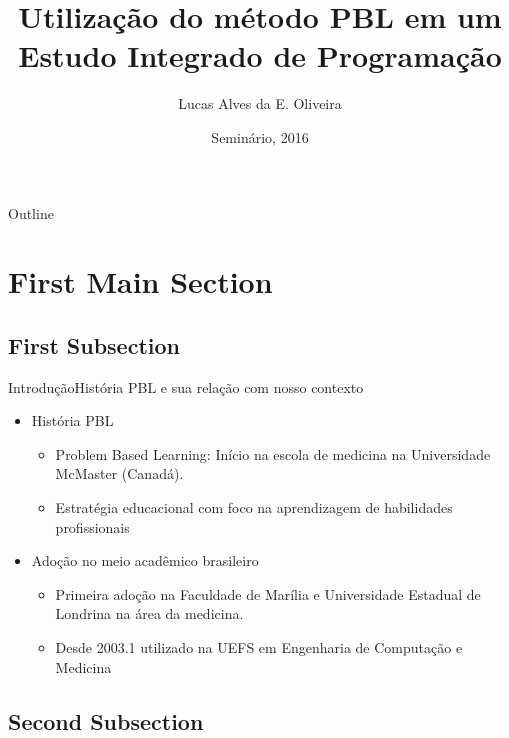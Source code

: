 \documentclass{beamer}
\title{Utilização do método PBL em um Estudo Integrado de Programação}
\author{Lucas Alves da E. Oliveira\inst{1}}
\institute[Universidade Estadual de Feira de Santana] %
{
  \inst{1}%
  Departmento de Ciências Exatas\\
  Universidade Estadual de Feira de Santana
  }
\date{Seminário, 2016}
\begin{document}
\begin{frame}
  \titlepage
\end{frame}

\begin{frame}{Outline}
  \tableofcontents
\end{frame}

\section{First Main Section}

\subsection{First Subsection}

\begin{frame}{Introdução}{História PBL e sua relação com nosso contexto}
  \begin{itemize}
    \item História PBL
    \begin{itemize}
        \item \alert{Problem Based Learning}: Início na escola de medicina na Universidade McMaster (Canadá).
        \item Estratégia educacional com foco na aprendizagem de habilidades profissionais
    \end{itemize} 
    \item Adoção no meio acadêmico brasileiro
    \begin{itemize}
        \item Primeira adoção na Faculdade de Marília e Universidade Estadual de Londrina na área da medicina.
        \item Desde 2003.1 utilizado na UEFS em Engenharia de Computação e Medicina
    \end{itemize}
  \end{itemize}
\end{frame}

\subsection{Second Subsection}
\end{document}

